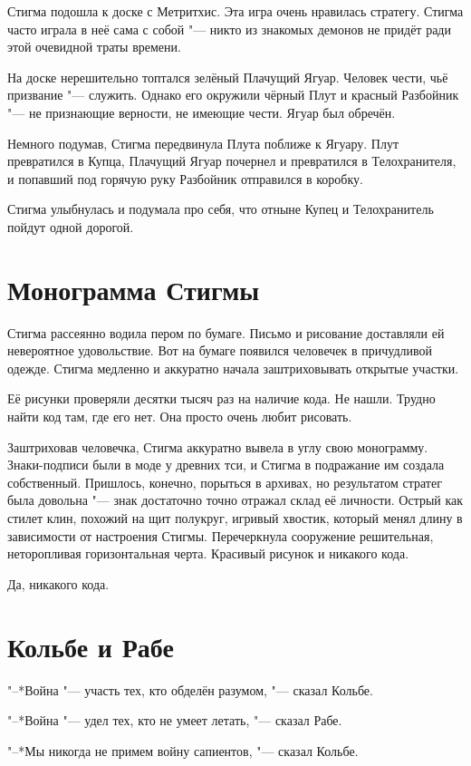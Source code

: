 \documentclass[a4paper,10pt,fleqn]{book}
\begin{document}
Стигма подошла к доске с Метритхис.
Эта игра очень нравилась стратегу.
Стигма часто играла в неё сама с собой "--- никто из знакомых демонов не придёт ради этой очевидной траты времени.

На доске нерешительно топтался зелёный Плачущий Ягуар.
Человек чести, чьё призвание "--- служить.
Однако его окружили чёрный Плут и красный Разбойник "--- не признающие верности, не имеющие чести.
Ягуар был обречён.

Немного подумав, Стигма передвинула Плута поближе к Ягуару.
Плут превратился в Купца, Плачущий Ягуар почернел и превратился в Телохранителя, и попавший под горячую руку Разбойник отправился в коробку.

Стигма улыбнулась и подумала про себя, что отныне Купец и Телохранитель пойдут одной дорогой.

\section{Монограмма Стигмы}

Стигма рассеянно водила пером по бумаге.
Письмо и рисование доставляли ей невероятное удовольствие.
Вот на бумаге появился человечек в причудливой одежде.
Стигма медленно и аккуратно начала заштриховывать открытые участки.

Её рисунки проверяли десятки тысяч раз на наличие кода.
Не нашли.
Трудно найти код там, где его нет.
Она просто очень любит рисовать.

Заштриховав человечка, Стигма аккуратно вывела в углу свою монограмму.
Знаки-подписи были в моде у древних тси, и Стигма в подражание им создала собственный.
Пришлось, конечно, порыться в архивах, но результатом стратег была довольна "--- знак достаточно точно отражал склад её личности.
Острый как стилет клин, похожий на щит полукруг, игривый хвостик, который менял длину в зависимости от настроения Стигмы.
Перечеркнула сооружение решительная, неторопливая горизонтальная черта.
Красивый рисунок и никакого кода.

Да, никакого кода.

\section{Кольбе и Рабе}

"--*Война "--- участь тех, кто обделён разумом, "--- сказал Кольбе.

"--*Война "--- удел тех, кто не умеет летать, "--- сказал Рабе.

"--*Мы никогда не примем войну сапиентов, "--- сказал Кольбе.
\end{document}
